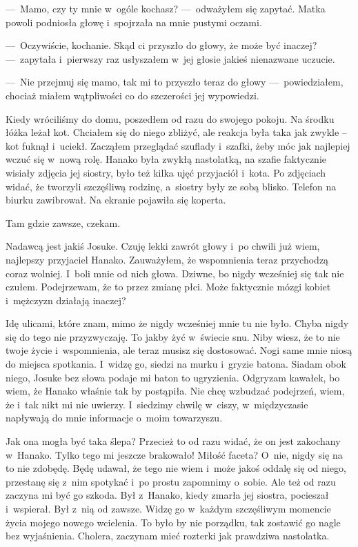 ---~Mamo, czy ty mnie w~ogóle kochasz? ---~odważyłem się zapytać. Matka powoli podniosła głowę i~spojrzała na mnie pustymi oczami. 

---~Oczywiście, kochanie. Skąd ci przyszło do głowy, że może być inaczej? ---~zapytała i~pierwszy raz usłyszałem w~jej głosie jakieś nienazwane uczucie. 

---~Nie przejmuj się mamo, tak mi to przyszło teraz do głowy ---~powiedziałem, chociaż miałem wątpliwości co do szczerości jej wypowiedzi.

Kiedy wróciliśmy do domu, poszedłem od razu do swojego pokoju. Na środku łóżka leżał kot. Chciałem się do niego zbliżyć, ale reakcja była taka jak zwykle -- kot fuknął i~uciekł. Zacząłem przeglądać szuflady i~szafki, żeby móc jak najlepiej wczuć się w~nową rolę. Hanako była zwykłą nastolatką, na szafie faktycznie wisiały zdjęcia jej siostry, było też kilka ujęć przyjaciół i~kota. Po zdjęciach widać, że tworzyli szczęśliwą rodzinę, a~siostry były ze sobą blisko. Telefon na biurku zawibrował. Na ekranie pojawiła się koperta.

\begin{sms}
Tam gdzie zawsze, czekam.
\end{sms}

Nadawcą jest jakiś Josuke. Czuję lekki zawrót głowy i~po chwili już wiem, najlepszy przyjaciel Hanako. Zauważyłem, że wspomnienia teraz przychodzą coraz wolniej. I~boli mnie od nich głowa. Dziwne, bo nigdy wcześniej się tak nie czułem. Podejrzewam, że to przez zmianę płci. Może faktycznie mózgi kobiet i~mężczyzn działają inaczej?

Idę ulicami, które znam, mimo że nigdy wcześniej mnie tu nie było. Chyba nigdy się do tego nie przyzwyczaję. To jakby żyć w~świecie snu. Niby wiesz, że to nie twoje życie i~wspomnienia, ale teraz musisz się dostosować. Nogi same mnie niosą do miejsca spotkania. I~widzę go, siedzi na murku i~gryzie batona. Siadam obok niego, Josuke bez słowa podaje mi baton to ugryzienia. Odgryzam kawałek, bo wiem, że Hanako właśnie tak by postąpiła. Nie chcę wzbudzać podejrzeń, wiem, że i~tak nikt mi nie uwierzy. I~siedzimy chwilę w~ciszy, w~międzyczasie napływają do mnie informacje o~moim towarzyszu. 

Jak ona mogła być taka ślepa? Przecież to od razu widać, że on jest zakochany w~Hanako. Tylko tego mi jeszcze brakowało! Miłość faceta? O~nie, nigdy się na to nie zdobędę. Będę udawał, że tego nie wiem i~może jakoś oddalę się od niego, przestanę się z~nim spotykać i~po prostu zapomnimy o~sobie. Ale też od razu zaczyna mi być go szkoda. Był z~Hanako, kiedy zmarła jej siostra, pocieszał i~wspierał. Był z~nią od zawsze. Widzę go w~każdym szczęśliwym momencie życia mojego nowego wcielenia. To było by nie porządku, tak zostawić go nagle bez wyjaśnienia. Cholera, zaczynam mieć rozterki jak prawdziwa nastolatka. 

